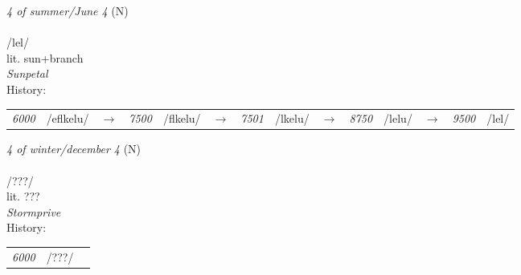 \vspace{15pt}
\begin{nopagebreak}
 \textit{4 of summer/June 4} (N)\\
\\
\noindent /l{\textprimstress}el/\\
\noindent lit. sun+branch\\
\noindent \textit{Sunpetal}\\


\noindent History:

\vspace{-0pt}
\hspace{40pt}
\begin{tabular}{ccc}
\textit{6000} & /eflkelu/&$\rightarrow$ & \textit{7500} & /flkelu/&$\rightarrow$ & \textit{7501} & /lkelu/&$\rightarrow$ & \textit{8750} & /lelu/&$\rightarrow$ & \textit{9500} & /lel/& \\
\end{tabular}

\vspace{20pt}\hline

\end{nopagebreak}
\filbreak



\vspace{15pt}
\begin{nopagebreak}
 \textit{4 of winter/december 4} (N)\\
\\
\noindent /???/\\
\noindent lit. ???\\
\noindent \textit{Stormprive}\\


\noindent History:

\vspace{-0pt}
\hspace{40pt}
\begin{tabular}{ccc}
\textit{6000} & /???/& \\
\end{tabular}

\vspace{20pt}\hline

\end{nopagebreak}
\filbreak



